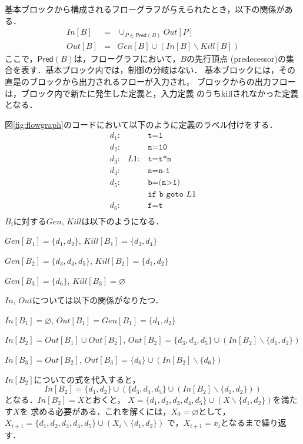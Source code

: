 \documentclass[dvipdfmx,a4j]{jbook}
\begin{document}
基本ブロックから構成されるフローグラフが与えられたとき，以下の関係がある．
\begin{eqnarray}
    In[B] & = & \cup_{P\in\mathsf{Pred}(B)}Out[P]\\
    Out[B] & = & Gen[B]\cup (In[B]\backslash Kill[B])
\end{eqnarray}
ここで，$\mathsf{Pred}(B)$は，フローグラフにおいて，$B$の先行頂点
(predecessor)の集合を表す．基本ブロック内では，制御の分岐はない．
基本ブロックには，その直是のブロックから出力されるフローが入力され，
ブロックからの出力フローは，ブロック内で新たに発生した定義と，入力定義
のうちkillされなかった定義となる．

図\ref{fig:flowgraph}のコードにおいて以下のように定義のラベル付けをする．
\[
    \begin{array}{rrl}
        d_1: &     & \texttt{t=1}          \\
        d_2: &     & \texttt{n=10}         \\
        d_3: & L1: & \texttt{t=t*n}        \\
        d_4: &     & \texttt{n=n-1}        \\
        d_5: &     & \texttt{b=(n>1)}      \\
             &     & \texttt{if b goto }L1 \\
        d_6: &     & \texttt{f=t}          \\
    \end{array}
\]
$B_i$に対する$Gen$, $Kill$は以下のようになる．
\begin{trivlist}
    \item $Gen[B_1]=\{d_1,d_2\}$, $Kill[B_1]=\{d_3,d_4\}$
    \item $Gen[B_2]=\{d_3,d_4,d_5\}$, $Kill[B_2]=\{d_1,d_2\}$
    \item $Gen[B_3]=\{d_6\}$, $Kill[B_3]=\varnothing$
\end{trivlist}
$In$, $Out$については以下の関係がなりたつ．
\begin{trivlist}
    \item $In[B_1]=\varnothing$, $Out[B_1]=Gen[B_1]=\{d_1,d_2\}$
    \item $In[B_2]=Out[B_1]\cup Out[B_2]$, $Out[B_2]=\{d_3,d_4,d_5\}\cup(In[B_2]\backslash\{d_1,d_2\})$
    \item $In[B_3]=Out[B_2]$, $Out[B_3]=\{d_6\}\cup(In[B_2]\backslash\{d_6\})$
\end{trivlist}
$In[B_2]$についての式を代入すると，
\[In[B_2]=\{d_1,d_2\}\cup(\{d_3,d_4,d_5\}\cup(In[B_2]\backslash\{d_1,d_2\}))\]となる．$In[B_2]=X$とおくと，
$X=\{d_1,d_2,d_3,d_4,d_5\}\cup (X\backslash\{d_1,d_2\})$を満たす$X$を
求める必要がある．これを解くには，$X_0=\varnothing$として，
$X_{i+1}=\{d_1,d_2,d_3,d_4,d_5\}\cup (X_i\backslash\{d_1,d_2\})$
で，$X_{i+1}=x_i$となるまで繰り返す．
\end{document}
